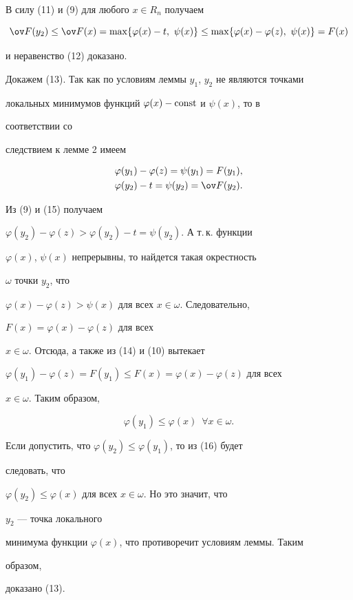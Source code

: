  


\begin{pf} В силу (11) и (9) для любого $x\in R_n$ получаем 


$$ 


\ov F(y_2)\le\ov F(x)=\max\{\varphi(x)-t,\ \psi(x)\}\le 


\max\{\varphi(x)-\varphi(z),\ \psi(x)\}=F(x) 


$$ 


и неравенство (12) доказано. 


 


Докажем (13). Так как по условиям леммы $y_1$, $y_2$ не являются точками 


локальных минимумов функций $\varphi(x)-\operatorname{const}$ и $\psi(x)$, то в 


соответствии со 


следствием к лемме 2 имеем 


\begin{gather} 


\varphi(y_1)-\varphi(z)=\psi(y_1)=F(y_1),\\ 


\varphi(y_2)-t=\psi(y_2)=\ov F(y_2). 


\end{gather} 


Из (9) и (15) получаем 


$\varphi(y_2)-\varphi(z)>\varphi(y_2)-t=\psi(y_2)$. А т.\,к.{} функции 


$\varphi(x)$, $\psi(x)$ непрерывны, то найдется такая окрестность 


$\omega$ точки $y_2$, что 


$\varphi(x)-\varphi(z)>\psi(x)$ для всех $x\in\omega$. Следовательно, 


$F(x)=\varphi(x)-\varphi(z)$ для всех 


$x\in\omega$. Отсюда, а также из (14) и (10) вытекает 


$\varphi(y_1)-\varphi(z)=F(y_1)\le F(x)=\varphi(x)-\varphi(z)$ для всех 


$x\in\omega$. Таким образом, 


\begin{equation} 


\varphi(y_1)\le\varphi(x)\ \; \forall x\in \omega. 


\end{equation} 


Если допустить, что $\varphi(y_2)\le\varphi(y_1)$, то из (16) будет 


следовать, что 


$\varphi(y_2)\le\varphi(x)$ для всех $x\in\omega$. Но это значит, что 


$y_2$ --- точка локального 


минимума функции $\varphi(x)$, что противоречит условиям леммы. Таким 


образом, 


доказано (13). 


\end{pf} 


